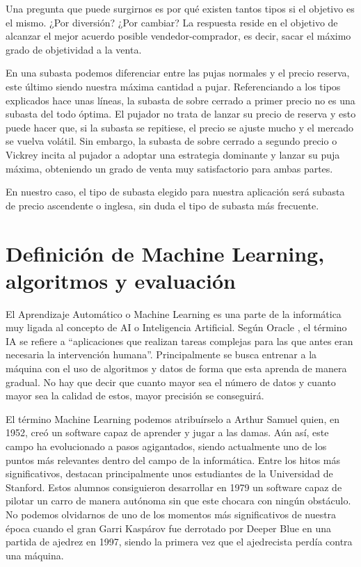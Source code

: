 	Una pregunta que puede surgirnos es por qué existen tantos tipos si el objetivo es el mismo. ¿Por diversión? ¿Por cambiar? La respuesta reside en el objetivo de alcanzar el mejor acuerdo posible vendedor-comprador, es decir, sacar el máximo grado de objetividad a la venta. 
	
	En una subasta podemos diferenciar entre las pujas normales y el precio reserva, este último siendo nuestra máxima cantidad a pujar. Referenciando a los tipos explicados hace unas líneas, la subasta de sobre cerrado a primer precio no es una subasta del todo óptima. El pujador no trata de lanzar su precio de reserva y esto puede hacer que, si la subasta se repitiese, el precio se ajuste mucho y el mercado se vuelva volátil. Sin embargo, la subasta de sobre cerrado a segundo precio o Vickrey incita al pujador a adoptar una estrategia dominante y lanzar su puja máxima, obteniendo un grado de venta muy satisfactorio para ambas partes.
	
	En nuestro caso, el tipo de subasta elegido para nuestra aplicación será subasta de precio ascendente o inglesa, sin duda el tipo de subasta más frecuente.
	
	

\section{Definición de Machine Learning, algoritmos y evaluación}

	El Aprendizaje Automático o Machine Learning es una parte de la informática muy ligada al concepto de AI o Inteligencia Artificial. Según Oracle \cite{oracle:homepage}, el término IA se refiere a ``aplicaciones que realizan tareas complejas para las que antes eran necesaria la intervención humana''. Principalmente se busca entrenar a la máquina con el uso de algoritmos y datos de forma que esta aprenda de manera gradual. No hay que decir que cuanto mayor sea el número de datos y cuanto mayor sea la calidad de estos, mayor precisión se conseguirá. 
	
	El término Machine Learning podemos atribuírselo a Arthur Samuel quien, en 1952, creó un software capaz de aprender y jugar a las damas. Aún así, este campo ha evolucionado a pasos agigantados, siendo actualmente uno de los puntos más relevantes dentro del campo de la informática. Entre los hitos más significativos, destacan principalmente unos estudiantes de la Universidad de Stanford. Estos alumnos consiguieron desarrollar en 1979 un software capaz de pilotar un carro de manera autónoma sin que este chocara con ningún obstáculo.  No podemos olvidarnos de uno de los momentos más significativos de nuestra época cuando el gran Garri Kaspárov fue derrotado por Deeper Blue en una partida de ajedrez en 1997, siendo la primera vez que el ajedrecista perdía contra una máquina.
	
